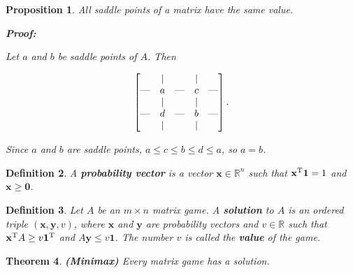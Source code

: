 \documentclass{article}
\theoremstyle{colontheorem}
\newtheorem{theorem}{Theorem}[section]
\newtheorem{proposition}[theorem]{Proposition}
\newtheorem{definition}[theorem]{Definition}
\newcommand{\T}{^\textnormal{T}}
\newenvironment{Theorem}
{
	\begin{mdframed}[backgroundcolor=TheoremOrange!10]
	\begin{theorem}
}
{
	\end{theorem}
	\end{mdframed}
	
	\vspace{.15in}
}
\newenvironment{Proposition}
{
	\begin{mdframed}[backgroundcolor=TheoremOrange!10]
	\begin{proposition}
}
{
	\end{proposition}
	\end{mdframed}
	
	\vspace{.15in}
}
\newenvironment{Def}
{
	\begin{mdframed}[backgroundcolor=DefGreen!10]
	\begin{definition}
}
{
	\end{definition}
	\end{mdframed}
	
	\vspace{.15in}
}
\newenvironment{Proof}
{
	\begin{mdframed}[backgroundcolor=ProofPurple!10]
	\textbf{Proof:}%
}
{
	\end{mdframed}
	
	\vspace{.085in}
}
\begin{document}
\begin{Proposition}
	
	All saddle points of a matrix have the same value.
	
	\begin{Proof}
		Let $a$ and $b$ be saddle points of $A$. Then
		
		$$
		\begin{bmatrix}
		
		& | & & | &\\
		\textnormal{---} & a & \textnormal{---} & c & \textnormal{---}\\
		& | & & | &\\
		\textnormal{---} & d & \textnormal{---} & b & \textnormal{---}\\
		& | & & | &\\
		
		\end{bmatrix}.
		$$
		
		Since $a$ and $b$ are saddle points, $a \leq c \leq b \leq d \leq a$, so $a = b$.
		
	\end{Proof}
	
\end{Proposition}



\begin{Def}
	
	A \textbf{probability vector} is a vector $\mathbf{x} \in \mathbb{R}^n$ such that $\mathbf{x}\T \mathbf{1} = 1$ and $\mathbf{x} \geq \mathbf{0}$.
	
\end{Def}



\begin{Def}
	
	Let $A$ be an $m \times n$ matrix game. A \textbf{solution} to $A$ is an ordered triple $(\mathbf{x}, \mathbf{y}, v)$, where $\mathbf{x}$ and $\mathbf{y}$ are probability vectors and $v \in \mathbb{R}$ such that $\mathbf{x}\T A \geq v \mathbf{1}\T$ and $A \mathbf{y} \leq v \mathbf{1}$. The number $v$ is called the \textbf{value} of the game.
	
\end{Def}



\begin{Theorem}
	
	\textbf{(Minimax)} Every matrix game has a solution.
	
\end{Theorem}
\end{document}
